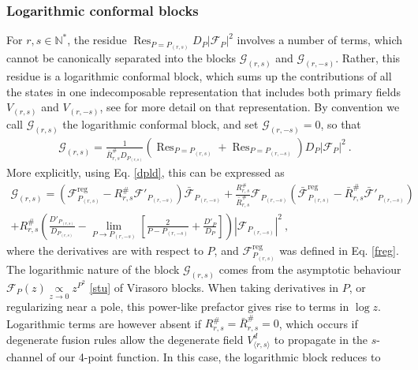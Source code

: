 \documentclass[12pt, a4paper]{article}
\theoremstyle{break}
\begin{document}
\subsubsection{Logarithmic conformal blocks}\label{sec:log}

For $r,s\in\mathbb{N}^*$, the residue $\operatorname{Res}_{P=P_{(r,s)}}D_P\left|\mathcal{F}_{P}\right|^2$ 
involves a number of terms, which cannot be canonically separated into the blocks 
$\mathcal{G}_{(r,s)}$ and $\mathcal{G}_{(r,-s)}$. Rather, this residue is a logarithmic conformal block, which sums up the contributions of all the states in one indecomposable representation that includes both primary fields $V_{(r,s)}$ and $V_{(r,-s)}$, see \cite{nr20} for more detail on that representation. By convention we call $\mathcal{G}_{(r,s)}$ the logarithmic conformal block, and set $\mathcal{G}_{(r,-s)}=0$, so that 
\begin{align}
 \mathcal{G}_{(r,s)} = \frac{1}{\bar R^{\#}_{r,s} D_{P_{(r,s)}}} \left( \operatorname{Res}_{P=P_{(r,s)}} + \operatorname{Res}_{P=P_{(r,-s)}}\right)D_P\left|\mathcal{F}_{P}\right|^2 \ . 
\end{align}
More explicitly, using Eq. \eqref{dpld}, this can be expressed as 
\begin{multline}
  \mathcal{G}_{(r,s)} = \left(\mathcal{F}^\text{reg}_{P_{(r,s)}} -R^{\#}_{r,s} \mathcal{F}'_{P_{(r,-s)}}\right) \bar{\mathcal{F}}_{P_{(r,-s)}} 
  + \frac{R^{\#}_{r,s}}{\bar{R}^{\#}_{r,s}} \mathcal{F}_{P_{(r,-s)}} \left(\bar{\mathcal{F}}^\text{reg}_{P_{(r,s)}} -\bar R^{\#}_{r,s} \bar{\mathcal{F}}'_{P_{(r,-s)}}\right)
  \\
  + R^{\#}_{r,s} \left( \frac{D'_{P_{(r,s)}}}{D_{P_{(r,s)}}} - \lim_{P\to P_{(r,-s)}}\left[\frac{2}{P-P_{(r,-s)}} +\frac{D'_P}{D_P}\right]\right)
  \left|\mathcal{F}_{P_{(r,-s)}}\right|^2 
  \ ,
\end{multline}
where the derivatives are with respect to $P$, and
$\mathcal{F}^\text{reg}_{P_{(r,s)}}$ was defined in Eq. \eqref{freg}.
The logarithmic nature of the block $\mathcal{G}_{(r,s)}$ comes from the asymptotic behaviour $\mathcal{F}_P(z)\underset{z\to 0}{\propto} z^{P^2} $ \eqref{stu} of Virasoro blocks. When taking derivatives in $P$, or regularizing near a pole, this power-like prefactor gives rise to terms in $\log z$. Logarithmic terms are however absent if $R^{\#}_{r,s}=\bar R^{\#}_{r,s}=0$, which occurs if degenerate fusion rules allow the degenerate field $V^d_{\langle r,s\rangle}$ to propagate in the $s$-channel of our 4-point function. In this case, the logarithmic block reduces to 
\end{document}
